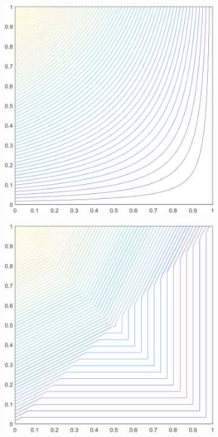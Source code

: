\begin{figure}
\label{fig::2D_Linear_Summary_unit_square_basis_functions}
\centering
	\begin{subfigure}[b]{0.39\textwidth}
		\centering
		\includegraphics[width=\textwidth]{figures/sec_BF/square_WACHSPRESS1_contour_b4.png}
		\caption{}
	\end{subfigure}
	\hspace{1.5cm}
	\begin{subfigure}[b]{0.39\textwidth}
		\centering
		\includegraphics[width=\textwidth]{figures/sec_BF/square_PWLD1_contour_b4.png}

\end{subfigure}
\end{figure}
